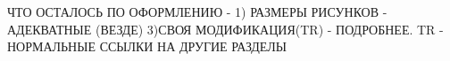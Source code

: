 ЧТО ОСТАЛОСЬ ПО ОФОРМЛЕНИЮ -
1) РАЗМЕРЫ РИСУНКОВ - АДЕКВАТНЫЕ (ВЕЗДЕ)
3)СВОЯ МОДИФИКАЦИЯ(TR) - ПОДРОБНЕЕ. TR - НОРМАЛЬНЫЕ ССЫЛКИ НА ДРУГИЕ РАЗДЕЛЫ